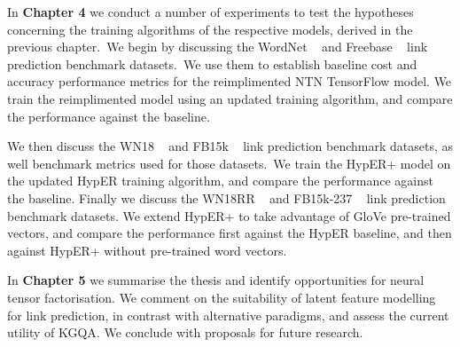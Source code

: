 \noindent In \textbf{Chapter 4} we conduct a number of experiments to test the hypotheses concerning the training algorithms of the respective models, derived in the previous chapter.\ We begin by discussing the WordNet \unskip ~\citep{miller1995wordnet} and Freebase \unskip ~\citep{bollacker2008freebase} link prediction benchmark datasets.\ We use them to establish baseline cost and accuracy performance metrics for the reimplimented NTN TensorFlow model. We train the reimplimented model using an updated training algorithm, and compare the performance against the baseline. \par

\noindent We then discuss the WN18 \unskip ~\citep{bordes2014semantic} and FB15k \unskip ~\citep{bordes2013translating} link prediction benchmark datasets, as well benchmark metrics used for those datasets.\ We train the HypER+ model on the updated HypER training algorithm, and compare the performance against the baseline. Finally we discuss the WN18RR \unskip ~\citep{dettmers2018convolutional} and FB15k-237 \unskip ~\citep{toutanova2015observed} link prediction benchmark datasets. We extend HypER+ to take advantage of GloVe pre-trained vectors, and  compare the performance first against the HypER baseline, and then against HypER+ without pre-trained word vectors. \par

\noindent In \textbf{Chapter 5} we summarise the thesis and identify opportunities for neural tensor factorisation. We comment on the suitability of latent feature modelling for link prediction, in contrast with alternative paradigms, and assess the current utility of KGQA. We conclude with proposals for future research.

